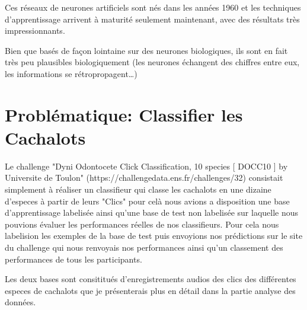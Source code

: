 Ces réseaux de neurones artificiels sont nés dans les années 1960 et les
techniques d'apprentissage arrivent à maturité seulement maintenant,
avec des résultats très impressionnants.

Bien que basés de façon lointaine sur des neurones biologiques, ils sont
en fait très peu plausibles biologiquement (les neurones échangent des
chiffres entre eux, les informations se rétropropagent\ldots{})


\hypertarget{problematique}{%
\section{Problématique: Classifier les Cachalots}\label{problematique}}

Le challenge "Dyni Odontocete Click Classification, 10 species [ DOCC10 ]
by Universite de Toulon" (https://challengedata.ens.fr/challenges/32) consistait simplement à réaliser un classifieur qui classe les cachalots en une dizaine d'especes à partir de leurs "Clics" pour celà nous avions a disposition une base d'apprentissage labelisée ainsi qu'une base de test non labelisée sur laquelle nous pouvions évaluer les performances réelles de nos classifieurs. Pour cela nous labelision les exemples de la base de test puis envoyions nos prédictions sur le site du challenge qui nous renvoyais nos performances ainsi qu'un classement des performances de tous les participants.

Les deux bases sont consititués d'enregistrements audios des clics des différentes especes de cachalots que je présenterais plus en détail dans la partie analyse des données.
